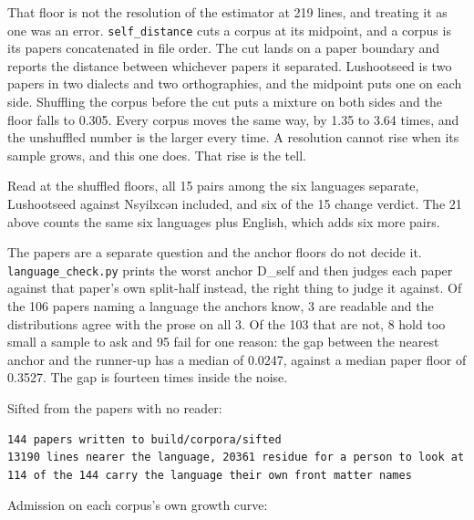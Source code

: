 That floor is not the resolution of the estimator at 219 lines, and treating it as one was an error. \texttt{self\_\allowbreak{}distance} cuts a corpus at its midpoint, and a corpus is its papers concatenated in file order. The cut lands on a paper boundary and reports the distance between whichever papers it separated. Lushootseed is two papers in two dialects and two orthographies, and the midpoint puts one on each side. Shuffling the corpus before the cut puts a mixture on both sides and the floor falls to 0.305. Every corpus moves the same way, by 1.35 to 3.64 times, and the unshuffled number is the larger every time. A resolution cannot rise when its sample grows, and this one does. That rise is the tell.

Read at the shuffled floors, all 15 pairs among the six languages separate, Lushootseed against Nsyilxcən included, and six of the 15 change verdict. The 21 above counts the same six languages plus English, which adds six more pairs.

The papers are a separate question and the anchor floors do not decide it. \texttt{language\_\allowbreak{}check.\allowbreak{}py} prints the worst anchor D\_self and then judges each paper against that paper's own split-half instead, the right thing to judge it against. Of the 106 papers naming a language the anchors know, 3 are readable and the distributions agree with the prose on all 3. Of the 103 that are not, 8 hold too small a sample to ask and 95 fail for one reason: the gap between the nearest anchor and the runner-up has a median of 0.0247, against a median paper floor of 0.3527. The gap is fourteen times inside the noise.

Sifted from the papers with no reader:

\begin{lstlisting}[breaklines=true,breakatwhitespace=false,basicstyle=\ttfamily\small]
144 papers written to build/corpora/sifted
13190 lines nearer the language, 20361 residue for a person to look at
114 of the 144 carry the language their own front matter names
\end{lstlisting}

Admission on each corpus's own growth curve:

